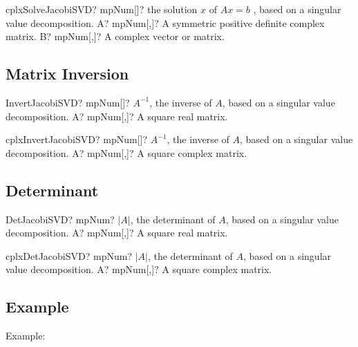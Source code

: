 \vspace{0.6cm}
\begin{mpFunctionsExtract}
	\mpFunctionTwo
	{cplxSolveJacobiSVD? mpNum[]? the solution $x$ of $A x = b$ , based on a singular value decomposition.}
	{A? mpNum[,]? A symmetric positive definite complex matrix.}
	{B? mpNum[,]? A complex vector or matrix.}
\end{mpFunctionsExtract}






\subsection{Matrix Inversion}

\begin{mpFunctionsExtract}
	\mpFunctionOne
	{InvertJacobiSVD? mpNum[]? $A^{-1}$, the inverse of $A$, based on a singular value decomposition.}
	{A? mpNum[,]? A square real matrix.}
\end{mpFunctionsExtract}

\vspace{0.6cm}
\begin{mpFunctionsExtract}
	\mpFunctionOne
	{cplxInvertJacobiSVD? mpNum[]? $A^{-1}$, the inverse of $A$, based on a singular value decomposition.}
	{A? mpNum[,]? A square complex matrix.}
\end{mpFunctionsExtract}




\subsection{Determinant}

\begin{mpFunctionsExtract}
	\mpFunctionOne
	{DetJacobiSVD? mpNum? $|A|$, the determinant of $A$, based on a singular value decomposition.}
	{A? mpNum[,]? A square real matrix.}
\end{mpFunctionsExtract}

\vspace{0.6cm}
\begin{mpFunctionsExtract}
	\mpFunctionOne
	{cplxDetJacobiSVD? mpNum? $|A|$, the determinant of $A$, based on a singular value decomposition.}
	{A? mpNum[,]? A square complex matrix.}
\end{mpFunctionsExtract}





\subsection{Example}
Example:

